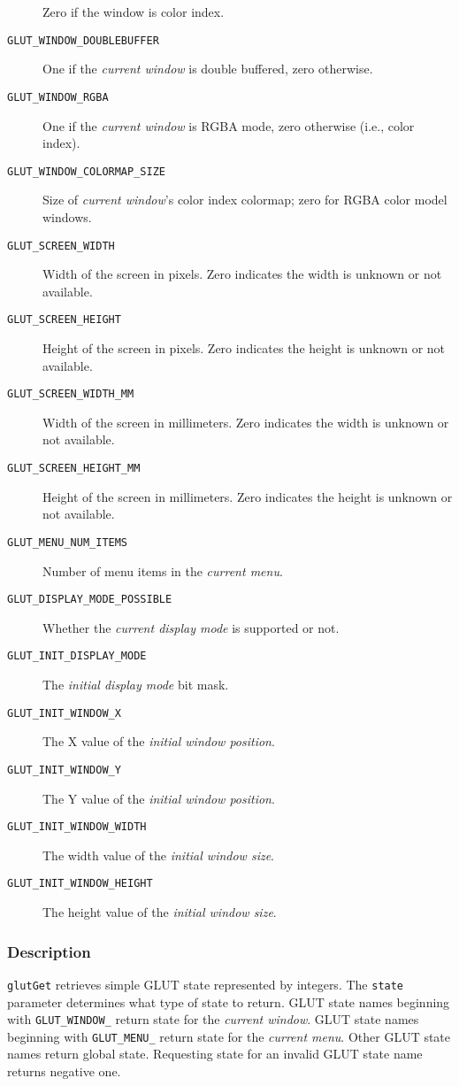 \begin{description}
Zero if the window is color index.
\item[\tt GLUT\_WINDOW\_DOUBLEBUFFER]
One if the {\em current window} is double buffered, zero otherwise.
\item[\tt GLUT\_WINDOW\_RGBA]
One if the {\em current window} is RGBA mode, zero otherwise (i.e., color index).
\item[\tt GLUT\_WINDOW\_COLORMAP\_SIZE]
Size of {\em current window}'s color index colormap; zero for RGBA color model windows.
\item[\tt GLUT\_SCREEN\_WIDTH]
Width of the screen in pixels.
Zero indicates the width is unknown or not available.
\item[\tt GLUT\_SCREEN\_HEIGHT]
Height of the screen in pixels.
Zero indicates the height is unknown or not available.
\item[\tt GLUT\_SCREEN\_WIDTH\_MM]
Width of the screen in millimeters.
Zero indicates the width is unknown or not available.
\item[\tt GLUT\_SCREEN\_HEIGHT\_MM]
Height of the screen in millimeters.
Zero indicates the height is unknown or not available.
\item[\tt GLUT\_MENU\_NUM\_ITEMS]
Number of menu items in the {\em current menu}.
\item[\tt GLUT\_DISPLAY\_MODE\_POSSIBLE]
Whether the {\em current display mode} is supported or not.
\item[\tt GLUT\_INIT\_DISPLAY\_MODE]
The {\em initial display mode} bit mask.
\item[\tt GLUT\_INIT\_WINDOW\_X]
The X value of the {\em initial window position}.
\item[\tt GLUT\_INIT\_WINDOW\_Y]
The Y value of the {\em initial window position}.
\item[\tt GLUT\_INIT\_WINDOW\_WIDTH]
The width value of the {\em initial window size}.
\item[\tt GLUT\_INIT\_WINDOW\_HEIGHT]
The height value of the {\em initial window size}.
\end{description}

\subsubsection*{Description}

{\tt glutGet} retrieves simple GLUT state represented by integers.
The {\tt state} parameter determines what type of state to
return.  GLUT state names beginning with {\tt GLUT\_WINDOW\_}
return state for the {\em current window}.  GLUT state names beginning
with {\tt GLUT\_MENU\_} return state for the {\em current menu}.
Other GLUT state names return global state.
Requesting state for an invalid GLUT state name returns negative one.

